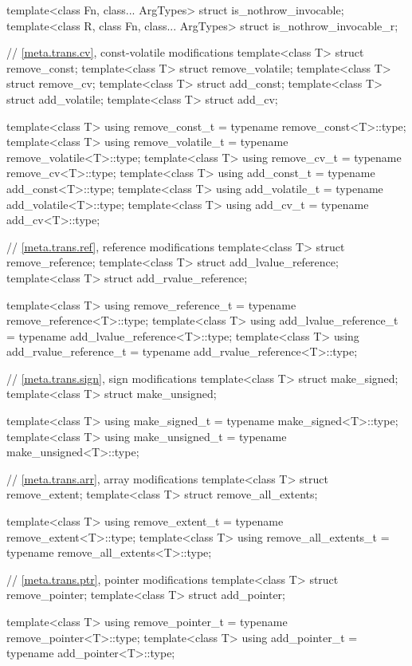 \begin{codeblock}
{  template<class Fn, class... ArgTypes> struct is_nothrow_invocable;
  template<class R, class Fn, class... ArgTypes> struct is_nothrow_invocable_r;

  // \ref{meta.trans.cv}, const-volatile modifications
  template<class T> struct remove_const;
  template<class T> struct remove_volatile;
  template<class T> struct remove_cv;
  template<class T> struct add_const;
  template<class T> struct add_volatile;
  template<class T> struct add_cv;

  template<class T>
    using remove_const_t    = typename remove_const<T>::type;
  template<class T>
    using remove_volatile_t = typename remove_volatile<T>::type;
  template<class T>
    using remove_cv_t       = typename remove_cv<T>::type;
  template<class T>
    using add_const_t       = typename add_const<T>::type;
  template<class T>
    using add_volatile_t    = typename add_volatile<T>::type;
  template<class T>
    using add_cv_t          = typename add_cv<T>::type;

  // \ref{meta.trans.ref}, reference modifications
  template<class T> struct remove_reference;
  template<class T> struct add_lvalue_reference;
  template<class T> struct add_rvalue_reference;

  template<class T>
    using remove_reference_t     = typename remove_reference<T>::type;
  template<class T>
    using add_lvalue_reference_t = typename add_lvalue_reference<T>::type;
  template<class T>
    using add_rvalue_reference_t = typename add_rvalue_reference<T>::type;

  // \ref{meta.trans.sign}, sign modifications
  template<class T> struct make_signed;
  template<class T> struct make_unsigned;

  template<class T>
    using make_signed_t   = typename make_signed<T>::type;
  template<class T>
    using make_unsigned_t = typename make_unsigned<T>::type;

  // \ref{meta.trans.arr}, array modifications
  template<class T> struct remove_extent;
  template<class T> struct remove_all_extents;

  template<class T>
    using remove_extent_t      = typename remove_extent<T>::type;
  template<class T>
    using remove_all_extents_t = typename remove_all_extents<T>::type;

  // \ref{meta.trans.ptr}, pointer modifications
  template<class T> struct remove_pointer;
  template<class T> struct add_pointer;

  template<class T>
    using remove_pointer_t = typename remove_pointer<T>::type;
  template<class T>
    using add_pointer_t    = typename add_pointer<T>::type;

}
\end{codeblock}
